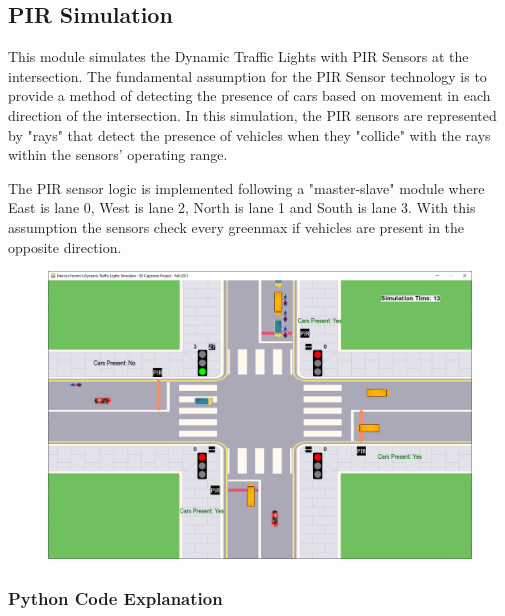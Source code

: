 \documentclass[12pt, a4paper,titlepage]{article}
\begin{document}
\newpage
\subsection{PIR Simulation}
\label{subsec_pir}

This module simulates the Dynamic Traffic Lights with PIR Sensors at the intersection. The fundamental assumption for the PIR Sensor technology is to provide a method of detecting the presence of cars based on movement in each direction of the intersection. In this simulation, the PIR sensors are represented by "rays" that detect the presence of vehicles when they "collide" with the rays within the sensors' operating range.

The PIR sensor logic is implemented following a "master-slave" module where East is lane 0, West is lane 2, North is lane 1 and South is lane 3. With this assumption the sensors check every greenmax if vehicles are present in the opposite direction.

\begin{figure}[H]
	\centering
	\includegraphics[width=\linewidth]{images/PIRsensor}
	\caption{}
	\label{fig:pirsensor}
\end{figure}

\subsubsection{Python Code Explanation}
\end{document}

